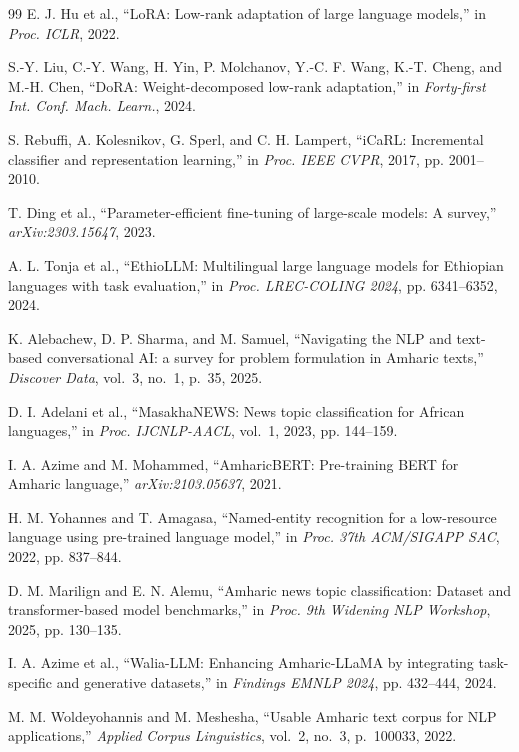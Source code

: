 \documentclass[11pt,a4paper]{article}
\begin{document}
\begin{thebibliography}{99}
E. J. Hu et al., ``LoRA: Low-rank adaptation of large language
models,'' in \emph{Proc. ICLR}, 2022.

S.-Y. Liu, C.-Y. Wang, H. Yin, P. Molchanov, Y.-C. F. Wang,
K.-T. Cheng, and M.-H. Chen, ``DoRA: Weight-decomposed low-rank
adaptation,'' in \emph{Forty-first Int. Conf. Mach. Learn.}, 2024.

S. Rebuffi, A. Kolesnikov, G. Sperl, and C. H. Lampert, ``iCaRL:
Incremental classifier and representation learning,'' in
\emph{Proc. IEEE CVPR}, 2017, pp. 2001--2010.

T. Ding et al., ``Parameter-efficient fine-tuning of large-scale
models: A survey,'' \emph{arXiv:2303.15647}, 2023.

A. L. Tonja et al., ``EthioLLM: Multilingual large language models
for Ethiopian languages with task evaluation,'' in
\emph{Proc. LREC-COLING 2024}, pp. 6341--6352, 2024.

K. Alebachew, D. P. Sharma, and M. Samuel, ``Navigating the NLP
and text-based conversational AI: a survey for problem formulation
in Amharic texts,'' \emph{Discover Data}, vol.~3, no.~1, p.~35, 2025.

D. I. Adelani et al., ``MasakhaNEWS: News topic classification for
African languages,'' in \emph{Proc. IJCNLP-AACL}, vol.~1, 2023,
pp. 144--159.

I. A. Azime and M. Mohammed, ``AmharicBERT: Pre-training BERT for
Amharic language,'' \emph{arXiv:2103.05637}, 2021.

H. M. Yohannes and T. Amagasa, ``Named-entity recognition for a
low-resource language using pre-trained language model,'' in
\emph{Proc. 37th ACM/SIGAPP SAC}, 2022, pp. 837--844.

D. M. Marilign and E. N. Alemu, ``Amharic news topic classification:
Dataset and transformer-based model benchmarks,'' in
\emph{Proc. 9th Widening NLP Workshop}, 2025, pp. 130--135.

I. A. Azime et al., ``Walia-LLM: Enhancing Amharic-LLaMA by
integrating task-specific and generative datasets,'' in
\emph{Findings EMNLP 2024}, pp. 432--444, 2024.

M. M. Woldeyohannis and M. Meshesha, ``Usable Amharic text corpus
for NLP applications,'' \emph{Applied Corpus Linguistics}, vol.~2,
no.~3, p.~100033, 2022.


\end{thebibliography}
\end{document}

